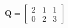 \documentclass[preview]{standalone}
\begin{document}
\begin{align*}
\mathbf{Q} = \begin{bmatrix} 2 & 1 & 1 \\  0 & 2 & 3 \end{bmatrix}
\end{align*}
\end{document}
